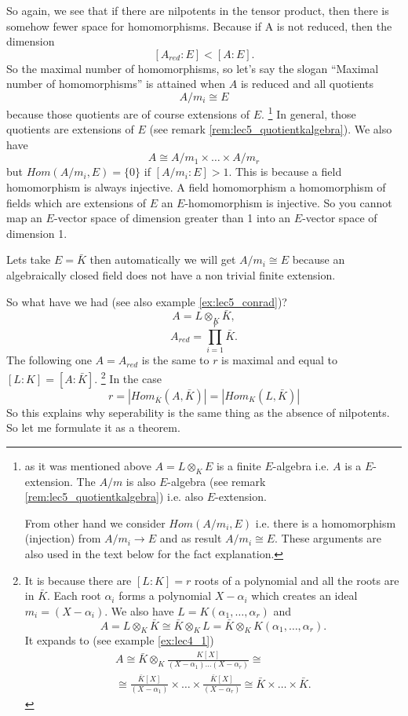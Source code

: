 So again, we see that if there are nilpotents in the tensor product,
then there is somehow fewer space for homomorphisms. Because if A is
not reduced, then the dimension
\[
\left[A_{red} : E\right] < \left[A : E\right].
\]
So the maximal number of homomorphisms, so let's say the slogan
``Maximal number of homomorphisms'' is attained when $A$ is reduced
and all quotients
\begin{equation}
  A/m_i \cong E
  \label{eq:lec5_1}
\end{equation}
because those quotients are of
course extensions of $E$.
\footnote{
  as it was mentioned above $A = L \otimes_K E$ is a finite
  $E$-algebra i.e. $A$ is a $E$-extension. The $A/m$ is also
  $E$-algebra (see remark
  \ref{rem:lec5_quotientkalgebra}) i.e. also $E$-extension.

  From other hand we consider $Hom\left(A/m_i, E\right)$ i.e. there is
  a homomorphism (injection) from $A/m_i \to E$ and as result
  $A/m_i \cong E$. These arguments are also used in the text below for
  the fact explanation. 
}
In general,    
those quotients are extensions of $E$ (see remark
  \ref{rem:lec5_quotientkalgebra}). We also have
\[
A \cong A/m_1 \times \dots \times A/m_r
\]
but $Hom\left(A/m_i, E\right) = \{0\}$ if $\left[A/m_i: E\right] > 1$.  
This is because a field homomorphism is always injective. A field
homomorphism a homomorphism of fields which are extensions of $E$  an
$E$-homomorphism is injective. So you cannot map an $E$-vector space of
dimension greater than 1 into an $E$-vector space of dimension 1.

Lets take $E = \bar{K}$ then automatically we will get
$A/m_i \cong E$ because an algebraically closed field does not have a
non trivial finite extension.

So what have we had (see also example \ref{ex:lec5_conrad})?
\[
A = L \otimes_K \bar{K},
\]
\[
A_{red} = \prod_{i=1}^r \bar{K}.
\]
The following one $A = A_{red}$ is the same to $r$ is maximal and
equal to $\left[L:K\right] = \left[A: \bar{K}\right]$.
\footnote{
  It is because there are $\left[L:K\right] = r$ roots of a
  polynomial and all the roots are in $\bar{K}$. Each root $\alpha_i$
  forms a polynomial $X - \alpha_i$ which creates an ideal $m_i =
  \left(X - \alpha_i\right)$. We also have
  $L = K\left(\alpha_1, \dots, \alpha_r\right)$ and
  \[
  A = L \otimes_K \bar{K} \cong \bar{K} \otimes_K L =
  \bar{K} \otimes_K K\left(\alpha_1, \dots, \alpha_r\right).
  \]
  It expands to (see example \ref{ex:lec4_1})
  \begin{eqnarray}
    A \cong \bar{K} \otimes_K \frac{K\left[X\right]}{(X-\alpha_1)
      \dots (X-\alpha_r)} \cong
    \nonumber \\
    \cong
    \frac{\bar{K}\left[X\right]}{\left(X - \alpha_1\right)}
    \times
    \dots
    \times
    \frac{\bar{K}\left[X\right]}{\left(X - \alpha_r\right)} 
    \cong \bar{K} \times \dots \times \bar{K}.
    \nonumber
  \end{eqnarray}
}
In the case
\[
r = \left|Hom_{\bar{K}}\left(A, \bar{K}\right)\right| = 
\left|Hom_K\left(L, \bar{K}\right)\right|
\]
So this explains why seperability is the same thing as the absence of
nilpotents. So let me formulate it as a theorem.

